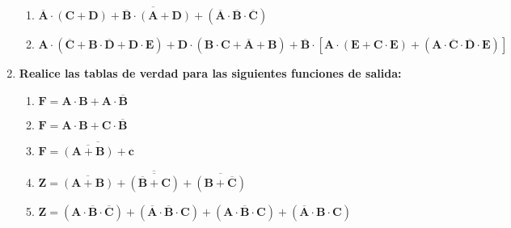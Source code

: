 \documentclass[12pt]{article}
\begin{document}
\begin{enumerate}[label = \textbf{\alph*.}]
\begin{enumerate}[label = \textbf{\arabic*.}]
                    \item $\mathbf{\overline{\overline{A} \cdot (C + D) + \overline{B} \cdot (A + D) + (\overline{A} \cdot \overline{B} \cdot \overline{C})}}$
                        \vspace{0.5cm}
                    
                    \item $\mathbf{A \cdot (\overline{C} + B \cdot \overline{D} + D \cdot E) + D \cdot (B \cdot C + \overline{A} + B) + \overline{B} \cdot [A \cdot (E + C \cdot E) + (A \cdot \overline{C} \cdot \overline{D} \cdot E)]}$
                        \vspace{0.5cm}
                    
                \end{enumerate}

            \item \textbf{Realice las tablas de verdad para las siguientes funciones de salida:}
                \begin{enumerate}[label = \textbf{\arabic*.}]
                    \item $\mathbf{F = A \cdot B + A \cdot \overline{B}}$
                    
                    \item $\mathbf{F = A \cdot B + C \cdot \overline{B}}$
                    
                    \item $\mathbf{F = \overline{\overline{(A + B)} + c}}$
                    
                    \item $\mathbf{Z = \overline{\overline{(A + B)} + \overline{(\overline{B} + C)} + \overline{(B + \overline{C})}}}$
                    
                    \item $\mathbf{Z = (A \cdot \overline{B} \cdot \overline{C}) + (\overline{A} \cdot \overline{B} \cdot C) + (A \cdot \overline{B} \cdot C) + (\overline{A} \cdot B \cdot C)}$
                    

\end{enumerate}
\end{enumerate}
\end{document}
